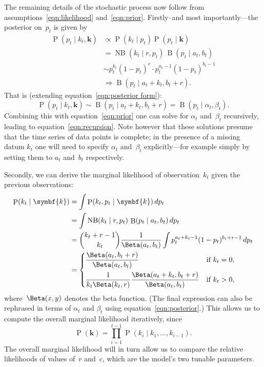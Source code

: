 \documentclass[12pt,a4paper]{article}
\newcommand\ub[1]{\symbf{#1}}                 %
\DeclareMathOperator\Pb{P}                    %
\DeclareMathOperator\B{B}                     %
\DeclareMathOperator\NB{NB}                   %
\begin{document}
The remaining details of the stochastic process now follow from
assumptions~\eqref{eqn:likelihood} and~\eqref{eqn:prior}. Firstly--and most
importantly---the posterior on~$p_t$ is given by
\begin{align*}
  \Pb(p_t \mid k_t, \ub{k}) &\propto \Pb(k_t \mid p_t) \Pb(p_t \mid \ub{k}) \\
  &= \NB(k_t \mid r, p_t)\, \B(p_t \mid a_t, b_t) \\
  &\sim p_t^{k_t} (1 - p_t)^r \cdot p_t^{a_t-1} (1 - p_t)^{b_t-1} \\
  &\Rightarrow \B(p_t \mid a_t + k_t, b_t + r).
\end{align*}
That is (extending equation~\eqref{eqn:posterior form}):
\begin{equation}\label{eqn:posterior}
  \Pb(p_t \mid k_t, \ub{k}) \sim \B(p_t \mid a_t + k_t, b_t + r)
  = \B(p_t \mid \alpha_t, \beta_t).
\end{equation}
Combining this with equation~\eqref{eqn:prior} one can solve for $\alpha_t$
and~$\beta_t$ recursively, leading to equation~\eqref{eqn:recursion}. Note
however that these solutions presume that the time series of data points is
complete; in the presence of a missing datum $k_t$ one will need to specify
$\alpha_t$ and~$\beta_t$ explicitly---for example simply by setting them to
$a_t$ and~$b_t$ respectively.

Secondly, we can derive the marginal likelihood of observation~$k_t$ given the
previous observations:
\begin{align}\label{eqn:marginal}
  \Pb(k_t \mid \ub{k}) &= \int \Pb(k_t, p_t \mid \ub{k})\, dp_t \nonumber \\
  &= \int \NB(k_t \mid r, p_t)\, \B(p_t \mid a_t, b_t)\, dp_t \nonumber \\
  &= \binom{k_t + r - 1}{k_t} \frac{1}{\Beta(a_t, b_t)}
    \int p_t^{a_t+k_t-1} (1 - p_t)^{b_t+r-1}\, dp_t \nonumber \\
  &= \begin{dcases}
    \frac{\Beta(a_t, b_t + r)}{\Beta(a_t, b_t)} &\text{if } k_t = 0, \\
    \frac{1}{k_t\Beta(k_t, r)}\frac{\Beta(a_t + k_t, b_t + r)}{\Beta(a_t, b_t)}
      &\text{if } k_t > 0,
  \end{dcases}
\end{align}
where~$\Beta(x, y)$ denotes the beta function. (The final expression can also be
rephrased in terms of $\alpha_t$ and $\beta_t$ using
equation~\eqref{eqn:posterior}.) This allows us to compute the overall marginal
likelihood iteratively, since
\begin{equation*}
  \Pb(\ub{k}) = \prod_{i=1}^{t-1} \Pb(k_i \mid k_1, \dots, k_{i-1}).
\end{equation*}
The overall marginal likelihood will in turn allow us to compare the relative
likelihoods of values of~$r$ and~$c$, which are the model's two tunable
parameters.
\end{document}
